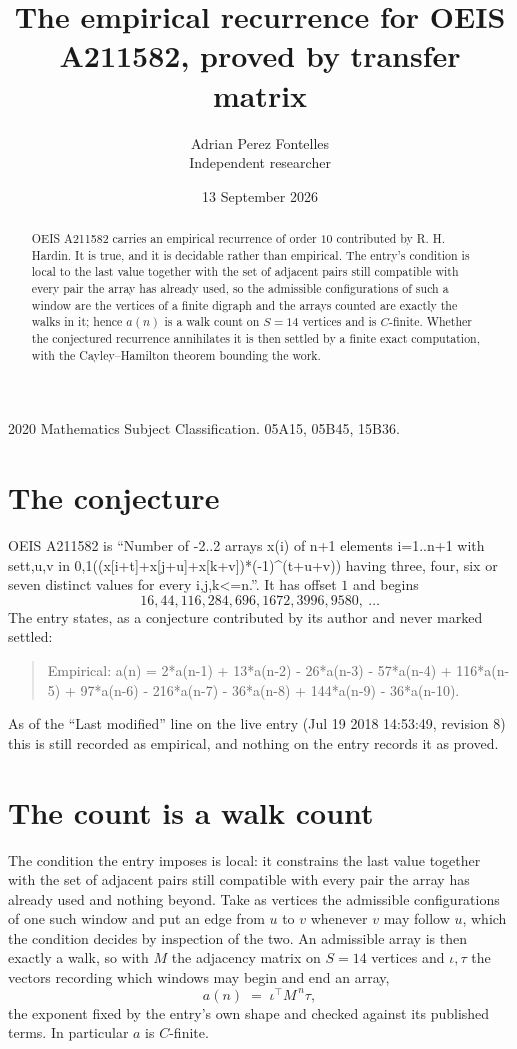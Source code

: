 \documentclass[11pt,a4paper]{article}
\title{The empirical recurrence for OEIS A211582, proved by transfer matrix}
\author{Adrian Perez Fontelles\\ \small Independent researcher}
\date{13 September 2026}
\theoremstyle{plain}
\theoremstyle{definition}
\begin{document}
\maketitle

\begin{abstract}
OEIS A211582 carries an empirical recurrence of order $10$ contributed by R. H. Hardin. It is
true, and it is decidable rather than empirical. The entry's condition is local to the last value together with the set of adjacent pairs still compatible with every pair the array has already used, so
the admissible configurations of such a window are the vertices of a finite digraph and the
arrays counted are exactly the walks in it; hence $a(n)$ is a walk count on $S=14$ vertices
and is $C$-finite. Whether the conjectured recurrence annihilates it is then settled by a
finite exact computation, with the Cayley--Hamilton theorem bounding the work.
\end{abstract}

\noindent\small 2020 Mathematics Subject Classification. 05A15, 05B45, 15B36.\normalsize

\section{The conjecture}

OEIS A211582 is ``Number of -2..2 arrays x(i) of n+1 elements i=1..n+1 with set{t,u,v in 0,1}((x[i+t]+x[j+u]+x[k+v])*(-1)\^{}(t+u+v)) having three, four, six or seven distinct values for every i,j,k<=n.''. It has offset $1$ and begins
\[
16, 44, 116, 284, 696, 1672, 3996, 9580,\ \dots
\]
The entry states, as a conjecture contributed by its author and never marked settled:
\begin{quote}
Empirical: a(n) = 2*a(n-1) + 13*a(n-2) - 26*a(n-3) - 57*a(n-4) + 116*a(n-5) + 97*a(n-6) - 216*a(n-7) - 36*a(n-8) + 144*a(n-9) - 36*a(n-10).
\end{quote}
As of the ``Last modified'' line on the live entry (Jul 19 2018 14:53:49, revision 8) this is still
recorded as empirical, and nothing on the entry records it as proved.

\section{The count is a walk count}

The condition the entry imposes is local: it constrains the last value together with the set of adjacent pairs still compatible with every pair the array has already used and nothing beyond. Take as
vertices the admissible configurations of one such window and put an edge from $u$ to $v$
whenever $v$ may follow $u$, which the condition decides by inspection of the two. An
admissible array is then exactly a walk, so with $M$ the adjacency matrix on $S=14$ vertices
and $\iota,\tau$ the vectors recording which windows may begin and end an array,
\[
a(n)\;=\;\iota^{\!\top}M^{\,n}\tau ,
\]
the exponent fixed by the entry's own shape and checked against its published terms. In
particular $a$ is $C$-finite.
\end{document}
